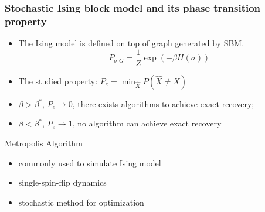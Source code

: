 \documentclass[notheorems]{beamer}
\begin{document}

\begin{frame}
	\frametitle{\large Stochastic Ising block model and its phase transition property}
\begin{itemize}
	\item The Ising model is defined on top of graph generated by SBM.
 	\begin{equation*}
 	P_{\sigma | G} = \frac{1}{Z} \exp(-\beta H(\bar{\sigma}))
 	\end{equation*}
	 \item The studied property: $P_e= \displaystyle\min_{\hat{X}} P(\hat{X} \neq X)$
	 \item $\beta > \beta^*$, $P_e \to 0$, there exists algorithms to achieve exact recovery;
	\item $\beta < \beta^*$, $P_e \to 1$, no algorithm can achieve exact recovery
\end{itemize}
\begin{block}{Metropolis Algorithm}
 \begin{itemize}
 	\item commonly used to simulate Ising model
 	\item single-spin-flip dynamics
 	\item stochastic method for optimization
 \end{itemize}
\end{block}
	\end{frame}
	
\end{document}
